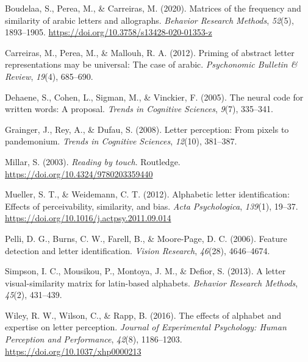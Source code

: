 \documentclass[english,man]{apa7}
\begin{document}
\begingroup
\setlength{\parindent}{-0.5in}
\setlength{\leftskip}{0.5in}

\hypertarget{refs}{}
\leavevmode\hypertarget{ref-Boudelaa_2020}{}%
Boudelaa, S., Perea, M., \& Carreiras, M. (2020). Matrices of the frequency and similarity of arabic letters and allographs. \emph{Behavior Research Methods}, \emph{52}(5), 1893--1905. \url{https://doi.org/10.3758/s13428-020-01353-z}

\leavevmode\hypertarget{ref-carreiras2012priming}{}%
Carreiras, M., Perea, M., \& Mallouh, R. A. (2012). Priming of abstract letter representations may be universal: The case of arabic. \emph{Psychonomic Bulletin \& Review}, \emph{19}(4), 685--690.

\leavevmode\hypertarget{ref-dehaene2005neural}{}%
Dehaene, S., Cohen, L., Sigman, M., \& Vinckier, F. (2005). The neural code for written words: A proposal. \emph{Trends in Cognitive Sciences}, \emph{9}(7), 335--341.

\leavevmode\hypertarget{ref-grainger2008letter}{}%
Grainger, J., Rey, A., \& Dufau, S. (2008). Letter perception: From pixels to pandemonium. \emph{Trends in Cognitive Sciences}, \emph{12}(10), 381--387.

\leavevmode\hypertarget{ref-Millar_2003}{}%
Millar, S. (2003). \emph{Reading by touch}. Routledge. \url{https://doi.org/10.4324/9780203359440}

\leavevmode\hypertarget{ref-Mueller_2012}{}%
Mueller, S. T., \& Weidemann, C. T. (2012). Alphabetic letter identification: Effects of perceivability, similarity, and bias. \emph{Acta Psychologica}, \emph{139}(1), 19--37. \url{https://doi.org/10.1016/j.actpsy.2011.09.014}

\leavevmode\hypertarget{ref-pelli2006feature}{}%
Pelli, D. G., Burns, C. W., Farell, B., \& Moore-Page, D. C. (2006). Feature detection and letter identification. \emph{Vision Research}, \emph{46}(28), 4646--4674.

\leavevmode\hypertarget{ref-simpson2013letter}{}%
Simpson, I. C., Mousikou, P., Montoya, J. M., \& Defior, S. (2013). A letter visual-similarity matrix for latin-based alphabets. \emph{Behavior Research Methods}, \emph{45}(2), 431--439.

\leavevmode\hypertarget{ref-Wiley_2016}{}%
Wiley, R. W., Wilson, C., \& Rapp, B. (2016). The effects of alphabet and expertise on letter perception. \emph{Journal of Experimental Psychology: Human Perception and Performance}, \emph{42}(8), 1186--1203. \url{https://doi.org/10.1037/xhp0000213}

\endgroup
\end{document}
